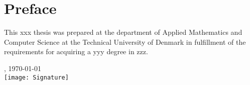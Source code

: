\chapter{Preface}
This xxx thesis was prepared at the department of Applied Mathematics and Computer Science at the Technical University of Denmark in fulfillment of the requirements for acquiring a yyy degree in zzz.

\vfill

{
\centering
    \thesislocation{}, \today\\[1cm]
    \hspace{3cm}\texttt{[image: Signature]}\\[1cm]
\begin{flushright}
    \thesisauthor{}
\end{flushright}
}